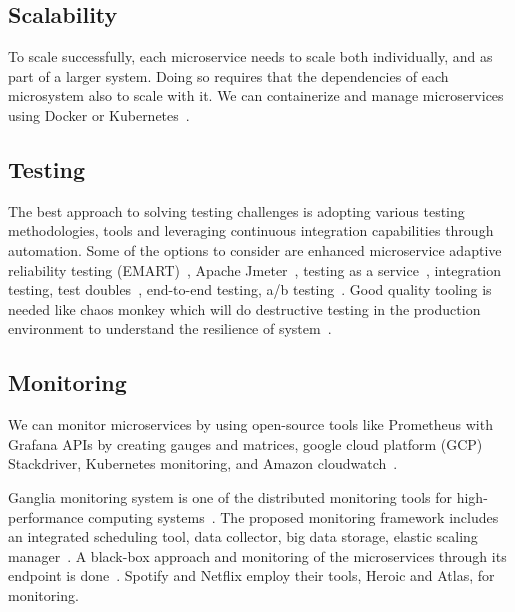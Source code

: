 \subsection{Scalability}%
 To scale successfully, each microservice needs to scale both individually, and as part of a larger system. Doing so requires that the dependencies of each microsystem also to scale with it. We can containerize and manage  microservices using Docker or Kubernetes~\cite{coulson2020, Bahadori2018, McElhiney2018, khan2020}.


\subsection{Testing}%
The best approach to solving testing challenges is adopting various testing methodologies, tools and leveraging continuous integration capabilities through automation.
Some of the options to consider are enhanced microservice adaptive reliability testing (EMART)~\cite{Russo2020}, Apache Jmeter~\cite{Johansson2019}, testing as a service~\cite{Vanska2019}, integration testing, test doubles~\cite{Huttunen2017}, end-to-end testing, a/b testing~\cite{Zaytev2018, Dmitrii2019}. Good quality tooling is needed like chaos monkey which will do destructive testing in the production environment to understand the resilience of system~\cite{Netflix}.


\subsection{Monitoring}%
We can monitor microservices by using open-source tools like Prometheus with Grafana APIs by creating gauges and matrices, google cloud platform (GCP) Stackdriver, Kubernetes monitoring, and Amazon cloudwatch~\cite{Kalske2017paper, Zhang2019, Monterio2018, Venugopal2017}.

Ganglia monitoring system is one of the distributed monitoring tools for high-performance computing systems~\cite{Kristiani2020}. The proposed monitoring framework includes an integrated scheduling tool, data collector, big data storage, elastic scaling manager~\cite{Zhihui2020}. %
%
%
A black-box approach and monitoring of the microservices through its endpoint is done~\cite{Utomo2020}. Spotify\cite{Kevin2015} and Netflix\cite{Netflix} employ their tools, Heroic and Atlas, for monitoring.

